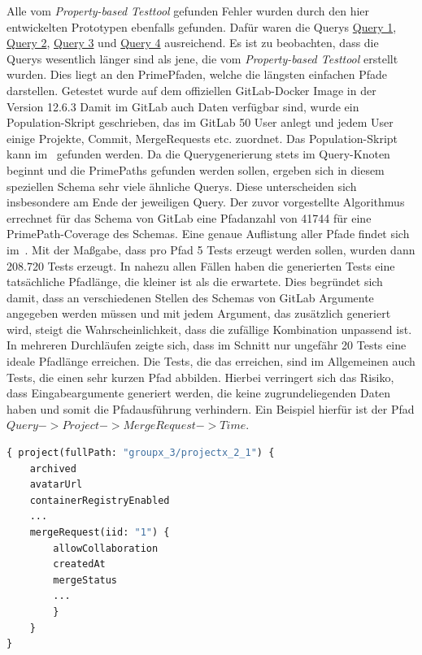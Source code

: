 Alle vom \textit{Property-based Testtool} gefunden Fehler wurden durch den hier entwickelten Prototypen ebenfalls gefunden.
Dafür waren die Querys \hyperref[query1]{Query 1}, \hyperref[query2]{Query 2}, \hyperref[query3]{Query 3} und \hyperref[query4]{Query 4} ausreichend.
Es ist zu beobachten, dass die Querys wesentlich länger sind als jene, die vom \textit{Property-based Testtool} erstellt wurden.
Dies liegt an den PrimePfaden, welche die längsten einfachen Pfade darstellen.
Getestet wurde auf dem offiziellen GitLab-Docker Image in der Version 12.6.3
Damit im GitLab auch Daten verfügbar sind, wurde ein Population-Skript geschrieben, das im GitLab
50 User anlegt und jedem User einige Projekte, Commit, MergeRequests etc. zuordnet.
Das Population-Skript kann im~\cite[Github]{populationscript} gefunden werden.
Da die Querygenerierung stets im Query-Knoten beginnt und die PrimePaths gefunden werden sollen, ergeben sich in diesem speziellen Schema sehr viele ähnliche Querys.
Diese unterscheiden sich insbesondere am Ende der jeweiligen Query.
Der zuvor vorgestellte Algorithmus errechnet für das Schema von GitLab eine Pfadanzahl von 41744 für eine PrimePath-Coverage des Schemas.
Eine genaue Auflistung aller Pfade findet sich im~\cite[GitHub]{gitlabpaths}.
Mit der Maßgabe, dass pro Pfad 5 Tests erzeugt werden sollen, wurden dann 208.720 Tests erzeugt.
In nahezu allen Fällen haben die generierten Tests eine tatsächliche Pfadlänge, die kleiner ist als die erwartete.
Dies begründet sich damit, dass an verschiedenen Stellen des Schemas von GitLab Argumente angegeben werden müssen
und mit jedem Argument, das zusätzlich generiert wird, steigt die Wahrscheinlichkeit, dass die zufällige Kombination unpassend ist.
In mehreren Durchläufen zeigte sich, dass im Schnitt nur ungefähr 20 Tests eine ideale Pfadlänge erreichen.
Die Tests, die das erreichen, sind im Allgemeinen auch Tests, die einen sehr kurzen Pfad abbilden.
Hierbei verringert sich das Risiko, dass Eingabeargumente generiert werden, die keine zugrundeliegenden Daten haben und somit die Pfadausführung verhindern.
Ein Beispiel hierfür ist der Pfad $Query -> Project -> MergeRequest -> Time$.

\begin{lstlisting}[language=GraphQL]
{ project(fullPath: "groupx_3/projectx_2_1") {
    archived
    avatarUrl
    containerRegistryEnabled
    ...
    mergeRequest(iid: "1") {
        allowCollaboration
        createdAt
        mergeStatus
        ...
        }
    }
}
\end{lstlisting}


